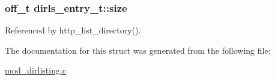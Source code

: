 \hypertarget{structdirls__entry__t_a4517c7829084ec4db378929f428b084a}{
\subsubsection[{size}]{\setlength{\rightskip}{0pt plus 5cm}off\-\_\-t dirls\-\_\-entry\-\_\-t\-::size}}\label{structdirls__entry__t_a4517c7829084ec4db378929f428b084a}


Referenced by http\-\_\-list\-\_\-directory().



The documentation for this struct was generated from the following file\-:\begin{DoxyCompactItemize}
\item 
\hyperlink{mod__dirlisting_8c}{mod\-\_\-dirlisting.\-c}\end{DoxyCompactItemize}
